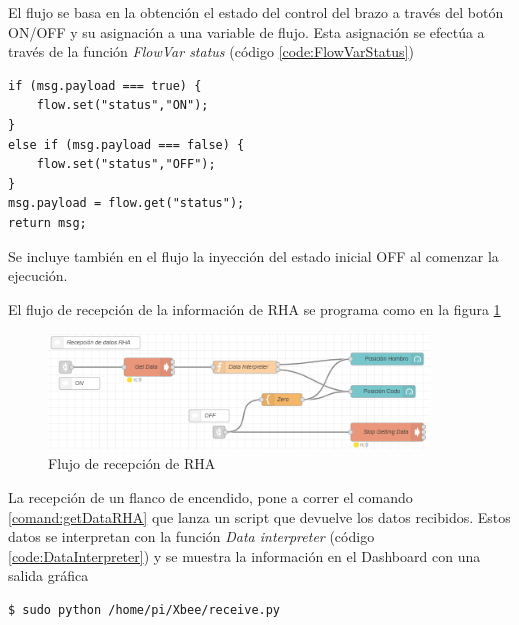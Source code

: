 El flujo se basa en la obtención el estado del control del brazo a través del botón ON/OFF y su asignación a una variable de flujo. Esta asignación se efectúa a través de la función \textit{FlowVar status} (código \ref{code:FlowVarStatus})



\begin{lstlisting}[frame=leftline, caption={FlowVar status}, label=code:FlowVarStatus]
if (msg.payload === true) {
    flow.set("status","ON");
}
else if (msg.payload === false) {
    flow.set("status","OFF");
}
msg.payload = flow.get("status");
return msg;
\end{lstlisting}

Se incluye también en el flujo la inyección del estado inicial OFF al comenzar la ejecución.

El flujo de recepción de la información de RHA se programa como en la figura \ref{fig:RecepcionRHA}

\begin{figure}[H]
\centering
\includegraphics[width=0.9\textwidth]{figuras/RecepcionFlowRHA.png}
\caption{Flujo de recepción de RHA}
\label{fig:RecepcionRHA}
\end{figure}

La recepción de un flanco de encendido, pone a correr el comando \ref{comand:getDataRHA} que lanza un script que devuelve los datos recibidos. Estos datos se interpretan con la función \textit{Data interpreter} (código \ref{code:DataInterpreter}) y se muestra la información en el Dashboard con una salida gráfica


\begin{lstlisting}[frame=single, label=command:getDataRHA]
$ sudo python /home/pi/Xbee/receive.py
\end{lstlisting}

